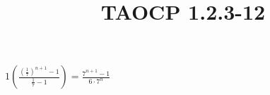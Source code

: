 \documentclass{article}
\title{TAOCP 1.2.3\mbox{-}12}
\begin{document}
\maketitle

\( 1(\frac{{(\frac{1}{7})}^{n+1} - 1}{\frac{1}{7} - 1}) = \frac{7^{n+1} - 1}{6\cdot7^{n}} \)
\end{document}
